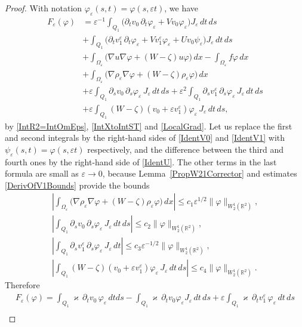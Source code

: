 \documentclass[reqno]{amsart}
\theoremstyle{plain}
\numberwithin{equation}{section}
\renewcommand{\kappa}{\varkappa}
\newcommand{\Real}{\mathbb R}
\newcommand{\eps}{\varepsilon}
\renewcommand{\phi}{\varphi}
\renewcommand{\leq}{\leqslant}
\begin{document}
\begin{proof}
With notation $\phi_\eps(s,t)=\phi(s,\eps t)$, we have
\begin{align*}
F_\eps(\phi)&=\eps^{-1}\int_{Q_1}\big(\partial_t v_0 \,\partial_t \phi_\eps
+Vv_0 \phi_\eps\big)J_\eps\,dt\, ds
\\
&+\int_{Q_1}\big(\partial_t v_1^\eps \,\partial_t \phi_\eps
+Vv_1^\eps \phi_\eps+Uv_0\psi_\eps\big)J_\eps\,dt\, ds
\\
&+\int_{\Omega_\eps}\big(\nabla u \nabla \phi+(W-\zeta)u\phi \big)\,dx-\int_{\Omega_\eps}f\phi\,dx
\\
&+\int_{\Omega_\eps}\big(\nabla\rho_\eps\nabla \phi
+(W-\zeta)\rho_\eps \phi\big)\,dx
\\
&+\eps\int_{Q_1}\partial_s v_0 \,\partial_s \phi_\eps\,J_\eps\,dt\, ds
+\eps^2\int_{Q_1}\partial_s v_1^\eps \,\partial_s \phi_\eps\,J_\eps\,dt\, ds
\\
&+\eps \int_{Q_1}(W-\zeta)(v_0+\eps v_1^\eps)\phi_\eps\,J_\eps\,dt\, ds,
\end{align*}
by \eqref{IntR2=IntOmEps}, \eqref{IntXtoIntST} and \eqref{LocalGrad}.
Let us replace the first and second integrals by the right-hand sides of \eqref{IdentV0} and \eqref{IdentV1} with $\psi_\eps(s,t)=\phi(s,\eps t)$ respectively, and the difference between  the third and fourth ones by the right-hand side of \eqref{IdentU}. The other terms in the last formula are small as $\eps\to 0$, because
Lemma~\ref{PropW21Corrector} and estimates \eqref{DerivOfV1Bounds} provide the bounds
\begin{gather*}
\left|\int_{\Omega_\eps}\big(\nabla\rho_\eps\nabla \phi
+(W-\zeta)\rho_\eps \phi\big)\,dx\right|
\leq c_1 \eps^{1/2}\|\phi\|_{W_2^1(\Real^2)},\\
\left|\int_{Q_1}\partial_s v_0 \,\partial_s \phi_\eps\,J_\eps\,dt\, ds\right|\leq c_2 \|\phi\|_{W_2^1(\Real^2)},\\
\left|\int_{Q_1}\partial_s v_1^\eps \,\partial_s \phi_\eps\,J_\eps\,dt\right|\leq c_3 \eps^{-1/2} \|\phi\|_{W_2^1(\Real^2)},\\
\left|\int_{Q_1}(W-\zeta)(v_0+\eps v_1^\eps)\phi_\eps\,J_\eps\,dt\, ds\right|\leq c_4 \|\phi\|_{W_2^1(\Real^2)}.
\end{gather*}
Therefore
\begin{multline*}
F_\eps(\phi)= \int_{Q_1} \kappa\,\partial_t v_0\, \phi_\eps \,dt ds-\int_{Q_1}\kappa \,\partial_t v_0\phi_\eps J_\eps\,dt\, ds+\eps\int_{Q_1}\kappa \,\partial_t v_1^\eps\, \phi_\eps \,dt\, ds
\\

\end{multline*}
\end{proof}
\end{document}
